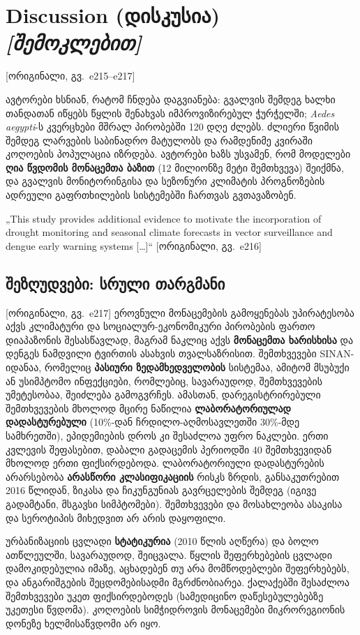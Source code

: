 \documentclass[11pt,a4paper]{article}
\newcommand{\pg}[1]{{\small\color{gray}[ორიგინალი, გვ.~#1]}}
\begin{document}
\section{Discussion (დისკუსია) \textit{[შემოკლებით]}} \pg{e215--e217}

ავტორები ხსნიან, რატომ ჩნდება დაგვიანება: გვალვის შემდეგ ხალხი თანდათან იწყებს წყლის შენახვას იმპროვიზირებულ ჭურჭელში;
\textit{Aedes aegypti}-ს კვერცხები მშრალ პირობებში 120 დღე ძლებს. ძლიერი წვიმის შემდეგ ლარვების საბინადრო მატულობს და
რამდენიმე კვირაში კოღოების პოპულაცია იზრდება. ავტორები ხაზს უსვამენ, რომ მოდელები \textbf{ღია წვდომის მონაცემთა ბაზით}
(12 მილიონზე მეტი შემთხვევა) შეიქმნა, და გვალვის მონიტორინგისა და სეზონური კლიმატის პროგნოზების ადრეული გაფრთხილების
სისტემებში ჩართვას გვთავაზობენ.

\begin{citat}
„This study provides additional evidence to motivate the incorporation of drought monitoring and seasonal climate forecasts in
vector surveillance and dengue early warning systems [\ldots]“ \pg{e216}
\end{citat}

\subsection*{შეზღუდვები: სრული თარგმანი} \pg{e217}
ეროვნული მონაცემების გამოყენებას უპირატესობა აქვს კლიმატური და სოციალურ-ეკონომიკური პირობების ფართო დიაპაზონის შესასწავლად,
მაგრამ ნაკლიც აქვს \textbf{მონაცემთა ხარისხისა} და დენგეს ნამდვილი ტვირთის ასახვის თვალსაზრისით. შემთხვევები SINAN-იდანაა,
რომელიც \textbf{პასიური ზედამხედველობის} სისტემაა, ამიტომ მსუბუქი ან უსიმპტომო ინფექციები, რომლებიც, სავარაუდოდ, შემთხვევების
უმეტესობაა, შეიძლება გამოგვრჩეს. ამასთან, დარეგისტრირებული შემთხვევების მხოლოდ მცირე ნაწილია \textbf{ლაბორატორიულად
დადასტურებული} (10\%-დან ჩრდილო-აღმოსავლეთში 30\%-მდე სამხრეთში), ეპიდემიების დროს კი შესაძლოა უფრო ნაკლები. ერთი კვლევის
შეფასებით, დაბალი გადაცემის პერიოდში 40 შემთხვევიდან მხოლოდ ერთი ფიქსირდებოდა. ლაბორატორიული დადასტურების არარსებობა
\textbf{არასწორი კლასიფიკაციის} რისკს ზრდის, განსაკუთრებით 2016 წლიდან, ზიკასა და ჩიკუნგუნიას გავრცელების შემდეგ (იგივე
გადამტანი, მსგავსი სიმპტომები). შემთხვევები და მოსახლეობა ასაკისა და სეროტიპის მიხედვით არ არის დაყოფილი.

ურბანიზაციის ცვლადი \textbf{სტატიკურია} (2010 წლის აღწერა) და ბოლო ათწლეულში, სავარაუდოდ, შეიცვალა. წყლის შეფერხებების
ცვლადი დამოკიდებულია იმაზე, აცხადებენ თუ არა მომწოდებლები შეფერხებებს, და ანგარიშგების შეცდომებისადმი მგრძნობიარეა.
ქალაქებში შესაძლოა შემთხვევები უკეთ ფიქსირდებოდეს (სამედიცინო დაწესებულებებზე უკეთესი წვდომა). კოღოების სიმჭიდროვის მონაცემები
მიკრორეგიონის დონეზე ხელმისაწვდომი არ იყო.
\end{document}
